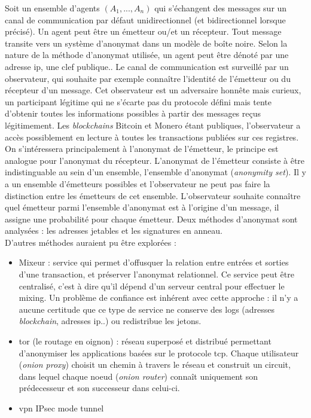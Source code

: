 Soit un ensemble d'agents $(A_1,...,A_n)$ qui s'échangent des messages sur un canal 
de communication par défaut unidirectionnel (et bidirectionnel lorsque précisé). 
Un agent peut être un émetteur ou/et un récepteur. Tout message transite vers un système d'anonymat
dans un modèle de boîte noire.
Selon la nature de la méthode d'anonymat utilisée, un agent peut être dénoté par 
une adresse \acrshort{ip}, une clef publique..
Le canal de communication est surveillé par un observateur, qui souhaite par exemple 
connaître l'identité de l'émetteur ou du récepteur d'un message.
Cet observateur est un adversaire honnête mais curieux\cite[2]{hbc}, un participant légitime qui ne s'écarte pas 
du protocole défini mais tente d'obtenir toutes les informations possibles à partir 
des messages reçus légitimement. Les \textit{\gls{blockchain}s} Bitcoin et Monero étant 
publiques, l'observateur a accès possiblement en lecture à toutes les transactions 
publiées sur ces registres. On s'intéressera principalement à l'anonymat de l'émetteur, 
le principe est analogue pour l'anonymat du récepteur. L'anonymat de l'émetteur 
consiste à être indistinguable\cite{anon_term} au sein d'un ensemble, l'ensemble d'anonymat 
(\og \textit{anonymity set}\fg). Il y a un ensemble d'émetteurs possibles
et l'observateur ne peut pas faire la distinction entre les émetteurs de cet 
ensemble. L'observateur souhaite connaître quel émetteur parmi l'ensemble d'anonymat 
est à l'origine d'un message, il assigne une probabilité pour chaque émetteur. Deux méthodes d'anonymat sont analysées : les adresses jetables et les signatures en anneau.\\
D'autres méthodes auraient pu être explorées :
\begin{itemize}
    \item Mixeur : service qui permet d'offusquer la relation entre entrées et sorties d'une transaction, et préserver l'anonymat relationnel. Ce service peut être centralisé, c'est à dire qu'il dépend d'un serveur central pour effectuer le mixing.
    Un problème de confiance est inhérent avec cette approche : il n'y a aucune certitude que ce type de service ne conserve des logs (adresses \textit{blockchain}, adresses \acrshort{ip}..) ou redistribue les jetons. 
    \item \acrshort{tor} (le routage en oignon) : réseau superposé et distribué permettant d'anonymiser les applications basées sur le protocole \acrshort{tcp}.
    Chaque utilisateur (\og \textit{onion proxy}\fg) choisit un chemin à travers le réseau et construit un circuit, dans lequel chaque noeud (\og \textit{onion router}\fg) connaît uniquement son prédecesseur et son successeur dans celui-ci.
    \item \acrshort{vpn} IPsec mode tunnel
\end{itemize}

